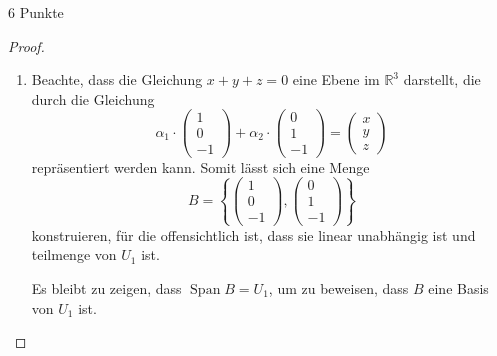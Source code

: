 \documentclass{problemset}
\begin{document}
\begin{problem}{6 Punkte}
\begin{proof}
    \begin{enumerate}
        \item Beachte, dass die Gleichung $x + y + z = 0$ eine Ebene im $\mathbb{R}^3$
              darstellt, die durch die Gleichung
              \[
                  \alpha_1 \cdot \begin{pmatrix}
                      1 \\
                      0 \\
                      -1
                  \end{pmatrix} + \alpha_2 \cdot \begin{pmatrix}
                      0 \\
                      1 \\
                      -1
                  \end{pmatrix} = \begin{pmatrix}
                      x \\
                      y \\
                      z
                  \end{pmatrix}
              \]
              repräsentiert werden kann. Somit lässt sich eine Menge
              \[
                  B = \left\{\begin{pmatrix}
                      1 \\
                      0 \\
                      -1
                  \end{pmatrix}, \begin{pmatrix}
                      0 \\
                      1 \\
                      -1
                  \end{pmatrix}\right\}
              \]
              konstruieren, für die offensichtlich ist, dass sie linear unabhängig ist und
              teilmenge von $U_1$ ist.

              Es bleibt zu zeigen, dass $\operatorname{Span} B = U_1$, um zu beweisen, dass
              $B$ eine Basis von $U_1$ ist.


\end{enumerate}
\end{proof}
\end{problem}
\end{document}
